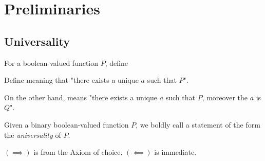 \section{Preliminaries}



\subsection{Universality}

\begin{definition}
For a boolean-valued function $P$, define
\end{definition}
\begin{definition}
Define
meaning that "there exists a unique $a$ such that $P$".
\end{definition}
\begin{remark}
On the other hand,
means "there exists a unique $a$ such that $P$, moreover the $a$ is $Q$".
\end{remark}

\begin{definition}[Universality]
Given a binary boolean-valued function $P$, we boldly call a statement of the form
the \emph{universality} of $P$.
\end{definition}

\begin{proposition}
\end{proposition}
\begin{strdproof}
$(\implies)$ is from the Axiom of choice. $(\impliedby)$ is immediate.
\end{strdproof}

